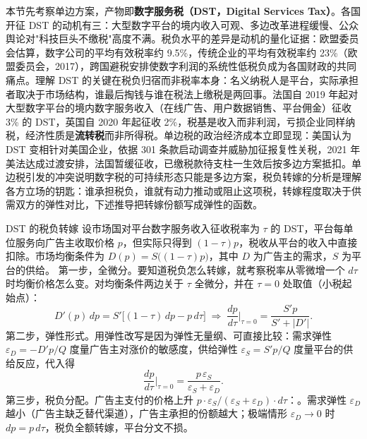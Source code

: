 本节先考察单边方案，产物即\textbf{数字服务税（DST，Digital Services Tax）}。各国开征 DST 的动机有三：大型数字平台的境内收入可观、多边改革进程缓慢、公众舆论对"科技巨头不缴税"高度不满。税负水平的差异是动机的量化证据：欧盟委员会估算，数字公司的平均有效税率约 9.5\%，传统企业的平均有效税率约 23\%（欧盟委员会，2017），跨国避税安排使数字利润的系统性低税负成为各国财政的共同痛点。理解 DST 的关键在税负归宿而非税率本身：名义纳税人是平台，实际承担者取决于市场结构，谁最后掏钱与谁在税法上缴税是两回事。法国自 2019 年起对大型数字平台的境内数字服务收入（在线广告、用户数据销售、平台佣金）征收 3\% 的 DST，英国自 2020 年起征收 2\%，税基是收入而非利润，亏损企业同样纳税，经济性质是\textbf{流转税}而非所得税。单边税的政治经济成本立即显现：美国认为 DST 变相针对美国企业，依据 301 条款启动调查并威胁加征报复性关税，2021 年美法达成过渡安排，法国暂缓征收，已缴税款待支柱一生效后按多边方案抵扣。单边税引发的冲突说明数字税的可持续形态只能是多边方案，税负转嫁的分析是理解各方立场的钥匙：谁承担税负，谁就有动力推动或阻止这项税，转嫁程度取决于供需双方的弹性对比，下述推导把转嫁份额写成弹性的函数。

\begin{derivation}{DST 的税负转嫁}{}
设市场国对平台数字服务收入征收税率为 $\tau$ 的 DST，平台每单位服务向广告主收取价格 $p$，但实际只得到 $(1-\tau)p$，税收从平台的收入中直接扣除。市场均衡条件为 $D(p) = S\bigl((1-\tau)p\bigr)$，其中 $D$ 为广告主的需求，$S$ 为平台的供给。
第一步，全微分。要知道税负怎么转嫁，就考察税率从零微增一个 $d\tau$ 时均衡价格怎么变。对均衡条件两边关于 $\tau$ 全微分，并在 $\tau = 0$ 处取值（小税起始点）：
\[
D'(p)\, dp = S'\bigl[(1-\tau)\, dp - p\, d\tau\bigr]
\;\Rightarrow\;
\frac{dp}{d\tau}\Big|_{\tau=0} = \frac{S' p}{S' + |D'|}.
\]
第二步，弹性形式。用弹性改写是因为弹性无量纲、可直接比较：需求弹性 $\varepsilon_D = -D' p / Q$ 度量广告主对涨价的敏感度，供给弹性 $\varepsilon_S = S' p / Q$ 度量平台的供给反应，代入得
\[
\frac{dp}{d\tau}\Big|_{\tau=0} = \frac{p\,\varepsilon_S}{\varepsilon_S + \varepsilon_D}.
\]
第三步，税负分配。广告主支付的价格上升 $p \cdot \varepsilon_S/(\varepsilon_S + \varepsilon_D) \cdot d\tau$：。需求弹性 $\varepsilon_D$ 越小（广告主缺乏替代渠道），广告主承担的份额越大；极端情形 $\varepsilon_D \to 0$ 时 $dp = p\, d\tau$，税负全额转嫁，平台分文不损。
\end{derivation}

